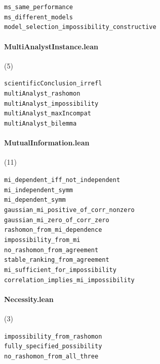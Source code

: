 {\footnotesize
\texttt{ms\_same\_performance}\\
\texttt{ms\_different\_models}\\
\texttt{model\_selection\_impossibility\_constructive}\\
}

\paragraph{MultiAnalystInstance.lean} (5)

{\footnotesize
\texttt{scientificConclusion\_irrefl}\\
\texttt{multiAnalyst\_rashomon}\\
\texttt{multiAnalyst\_impossibility}\\
\texttt{multiAnalyst\_maxIncompat}\\
\texttt{multiAnalyst\_bilemma}\\
}

\paragraph{MutualInformation.lean} (11)

{\footnotesize
\texttt{mi\_dependent\_iff\_not\_independent}\\
\texttt{mi\_independent\_symm}\\
\texttt{mi\_dependent\_symm}\\
\texttt{gaussian\_mi\_positive\_of\_corr\_nonzero}\\
\texttt{gaussian\_mi\_zero\_of\_corr\_zero}\\
\texttt{rashomon\_from\_mi\_dependence}\\
\texttt{impossibility\_from\_mi}\\
\texttt{no\_rashomon\_from\_agreement}\\
\texttt{stable\_ranking\_from\_agreement}\\
\texttt{mi\_sufficient\_for\_impossibility}\\
\texttt{correlation\_implies\_mi\_impossibility}\\
}

\paragraph{Necessity.lean} (3)

{\footnotesize
\texttt{impossibility\_from\_rashomon}\\
\texttt{fully\_specified\_possibility}\\
\texttt{no\_rashomon\_from\_all\_three}\\
}

